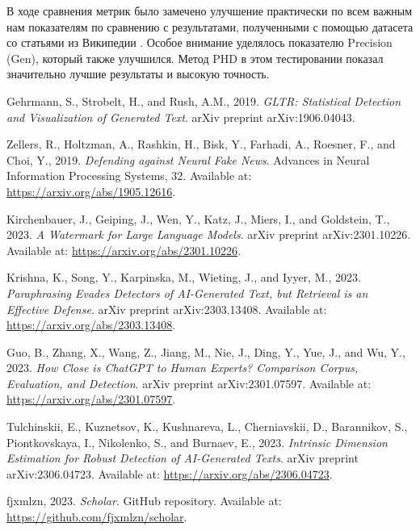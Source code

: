 \documentclass{math-mech-sci}
\begin{document}
В ходе сравнения метрик было замечено улучшение практически по всем важным нам показателям по сравнению с результатами, полученными с помощью датасета со статьями из Википедии \cite{tulchinskii2023intrinsic}. Особое внимание уделялось показателю Precision (Gen), который также улучшился. Метод PHD в этом тестировании показал значительно лучшие результаты и высокую точность.

\begin{thebibliography}{9}
Gehrmann, S., Strobelt, H., and Rush, A.M., 2019. 
\textit{GLTR: Statistical Detection and Visualization of Generated Text}. arXiv preprint arXiv:1906.04043.

Zellers, R., Holtzman, A., Rashkin, H., Bisk, Y., Farhadi, A., Roesner, F., and Choi, Y., 2019.
\textit{Defending against Neural Fake News}. Advances in Neural Information Processing Systems, 32. Available at: \url{https://arxiv.org/abs/1905.12616}.

Kirchenbauer, J., Geiping, J., Wen, Y., Katz, J., Miers, I., and Goldstein, T., 2023.
\textit{A Watermark for Large Language Models}. arXiv preprint arXiv:2301.10226. Available at: \url{https://arxiv.org/abs/2301.10226}.

Krishna, K., Song, Y., Karpinska, M., Wieting, J., and Iyyer, M., 2023.
\textit{Paraphrasing Evades Detectors of AI-Generated Text, but Retrieval is an Effective Defense}. arXiv preprint arXiv:2303.13408. Available at: \url{https://arxiv.org/abs/2303.13408}.

Guo, B., Zhang, X., Wang, Z., Jiang, M., Nie, J., Ding, Y., Yue, J., and Wu, Y., 2023.
\textit{How Close is ChatGPT to Human Experts? Comparison Corpus, Evaluation, and Detection}. arXiv preprint arXiv:2301.07597. Available at: \url{https://arxiv.org/abs/2301.07597}.

Tulchinskii, E., Kuznetsov, K., Kushnareva, L., Cherniavskii, D., Barannikov, S., Piontkovskaya, I., Nikolenko, S., and Burnaev, E., 2023.
\textit{Intrinsic Dimension Estimation for Robust Detection of AI-Generated Texts}. arXiv preprint arXiv:2306.04723. Available at: \url{https://arxiv.org/abs/2306.04723}.

fjxmlzn, 2023.
\textit{Scholar}. GitHub repository. Available at: \url{https://github.com/fjxmlzn/scholar}.










\end{thebibliography}
\end{document}

